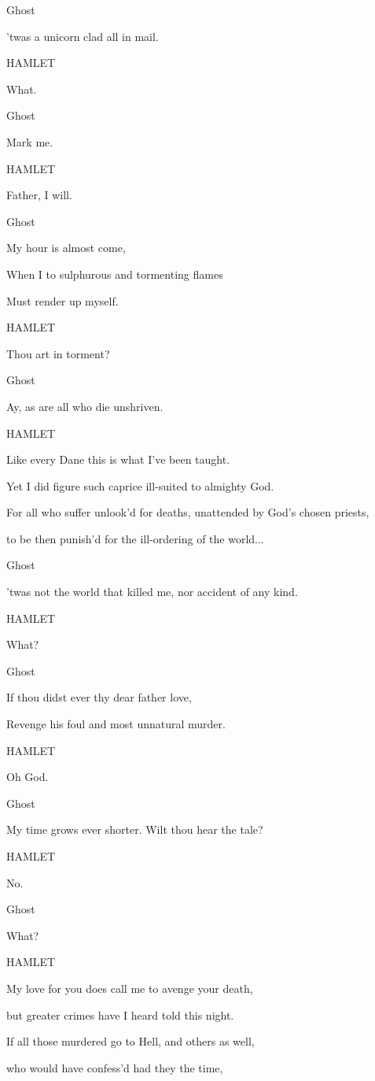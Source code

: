Ghost

'twas a unicorn clad all in mail.

HAMLET

What.

Ghost

Mark me.

HAMLET

Father, I will.

Ghost

My hour is almost come,

When I to sulphurous and tormenting flames

Must render up myself.

HAMLET

Thou art in torment?

Ghost

Ay, as are all who die unshriven.

HAMLET

Like every Dane this is what I've been taught.

Yet I did figure such caprice ill-suited to almighty God.

For all who suffer unlook'd for deaths, unattended by God's chosen
priests,

to be then punish'd for the ill-ordering of the world...

Ghost

'twas not the world that killed me, nor accident of any kind.

HAMLET

What?

Ghost

If thou didst ever thy dear father love,

Revenge his foul and most unnatural murder.

HAMLET

Oh God.

Ghost

My time grows ever shorter. Wilt thou hear the tale?

HAMLET

No.

Ghost

What?

HAMLET

My love for you does call me to avenge your death,

but greater crimes have I heard told this night.

If all those murdered go to Hell, and others as well,

who would have confess'd had they the time,

